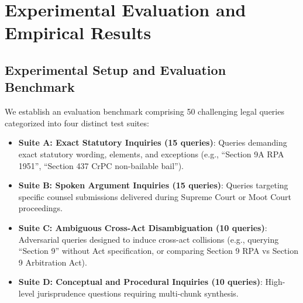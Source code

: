 \documentclass{llncs}
\begin{document}
\section{Experimental Evaluation and Empirical Results}
\label{sec:experiments}

\subsection{Experimental Setup and Evaluation Benchmark}
We establish an evaluation benchmark comprising 50 challenging legal queries categorized into four distinct test suites:
\begin{itemize}
    \item \textbf{Suite A: Exact Statutory Inquiries (15 queries)}: Queries demanding exact statutory wording, elements, and exceptions (e.g., ``Section 9A RPA 1951'', ``Section 437 CrPC non-bailable bail'').
    \item \textbf{Suite B: Spoken Argument Inquiries (15 queries)}: Queries targeting specific counsel submissions delivered during Supreme Court or Moot Court proceedings.
    \item \textbf{Suite C: Ambiguous Cross-Act Disambiguation (10 queries)}: Adversarial queries designed to induce cross-act collisions (e.g., querying ``Section 9'' without Act specification, or comparing Section 9 RPA vs Section 9 Arbitration Act).
    \item \textbf{Suite D: Conceptual and Procedural Inquiries (10 queries)}: High-level jurisprudence questions requiring multi-chunk synthesis.
\end{itemize}
\end{document}
